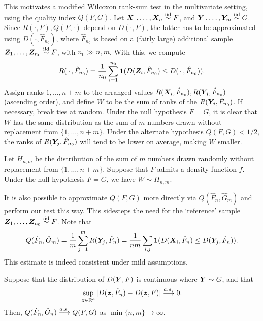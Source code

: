 This motivates a modified Wilcoxon rank-sum test in the multivariate setting,
using the quality index $Q(F, G)$.
Let $\bm{X}_1, \dots, \bm{X}_n \overset{\text{iid}}{\sim} F$, and $\bm{Y}_1, \dots, \bm{Y}_m \overset{\text{iid}}{\sim} G$.
Since $R(\cdot, F), Q(F, \cdot)$ depend on $D(\cdot, F)$, the latter has to be
approximated using $D(\cdot, \hat{F}_{n_0})$, where $\hat{F}_{n_0}$ is based
on a (fairly large) additional sample $\bm{Z}_1, \dots, \bm{Z}_{n_0} \overset{\text{iid}}{\sim} F$, with
$n_0 \gg n, m$.
With this, we compute
\begin{equation}
    R(\,\cdot\,, \hat{F}_{n_0}) = \frac{1}{n_0} \sum_{i = 1}^{n_0} \bm{1}(D(\bm{Z}_i, \hat{F}_{n_0}) \leq D(\,\cdot\,, \hat{F}_{n_0})).
\end{equation}
Assign ranks $1, \dots, n + m$ to the arranged values $R(\bm{X}_i,
\hat{F}_{n_0}), R(\bm{Y}_j, \hat{F}_{n_0})$ (ascending order), and define $W$ to
be the sum of ranks of the $R(\bm{Y}_j, \hat{F}_{n_0})$.
If necessary, break ties at random.
Under the null hypothesis $F = G$, it is clear that $W$ has the same
distribution as the sum of $m$ numbers drawn without replacement from $\{1,
\dots, n + m\}$.
Under the alternate hypothesis $Q(F, G) < 1/2$, the ranks of $R(\bm{Y}_j,
\hat{F}_{n_0})$ will tend to be lower on average, making $W$ smaller.

\begin{theorem}
    Let $H_{n, m}$ be the distribution of the sum of $m$ numbers drawn
    randomly without replacement from $\{1, \dots, n + m\}$.
    Suppose that $F$ admits a density function $f$.
    Under the null hypothesis $F = G$, we have $W \sim H_{n, m}$.
\end{theorem}

It is also possible to approximate $Q(F, G)$ more directly via $Q(\hat{F}_n,
\hat{G}_m)$ and perform our test this way.
This sidesteps the need for the `reference' sample $\bm{Z}_1, \dots, \bm{Z}_{n_0}
\overset{\text{iid}}{\sim} F$.
Note that
\begin{equation}
    Q(\hat{F}_n, \hat{G}_m)
    = \frac{1}{m}\sum_{j = 1}^m R(\bm{Y}_j, \hat{F}_n)
    = \frac{1}{nm}\sum_{i, j} \bm{1}(D(\bm{X}_i, \hat{F}_n) \leq D(\bm{Y}_j, \hat{F}_n)).
\end{equation}
This estimate is indeed consistent under mild assumptions.

\begin{theorem}
    Suppose that the distribution of $D(\bm{Y}, F)$ is continuous where $\bm{Y} \sim
    G$, and that
    \begin{equation}
        \sup_{\bm{z} \in \mathbb{R}^d} |D(\bm{z}, \hat{F}_n) - D(\bm{z}, F)| \overset{a.s.\,}{\longrightarrow} 0.
    \end{equation}
    Then, $Q(\hat{F}_n, \hat{G}_n) \overset{a.s.\,}{\longrightarrow} Q(F, G)$ as $\min\{n, m\} \to
    \infty$.
\end{theorem}

